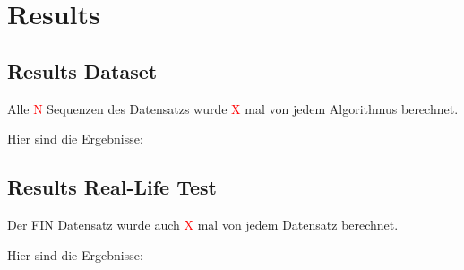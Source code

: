 \documentclass[main.tex]{subfiles}
\begin{document}
\section{Results}
\subsection{Results Dataset}

Alle %
\textcolor{red}{N} Sequenzen des Datensatzs wurde %
\textcolor{red}{X} mal von jedem Algorithmus berechnet.

Hier sind die Ergebnisse:

\subsection{Results Real-Life Test}

Der FIN Datensatz wurde auch %
\textcolor{red}{X} mal von jedem Datensatz berechnet.

Hier sind die Ergebnisse:
\end{document}

